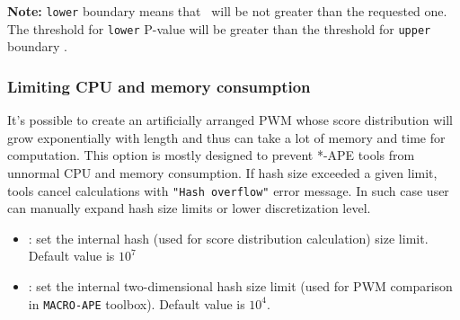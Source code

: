 \textbf{Note:} \texttt{lower} boundary means that \pvalue\ will be not greater than the requested one.
The threshold for \texttt{lower} P-value will be greater than the threshold for \texttt{upper} boundary \pvalue.


\subsubsection{Limiting CPU and memory consumption}
It's possible to create an artificially arranged PWM whose score distribution
 will grow exponentially with length and thus can take a lot of memory and time for computation.
 This option is mostly designed to prevent *-APE tools from unnormal CPU and memory consumption.
 If hash size exceeded a given limit, tools cancel calculations with \texttt{"Hash overflow"} error message.
 In such case user can manually expand hash size limits or lower discretization level.
  \begin{itemize}
  \item {}: set the internal hash (used for score distribution calculation) size limit. Default value is $10^7$
  \item {}: set the internal two-dimensional hash size limit (used for PWM comparison in \texttt{MACRO-APE} toolbox). Default value is $10^4$.
  \end{itemize}

